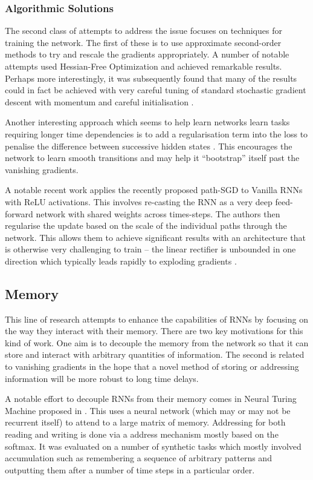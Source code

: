 \subsubsection{Algorithmic Solutions}
The second class of attempts to address the issue focuses on techniques for training the network.
 The first of these is to use approximate
second-order methods to try and rescale the gradients appropriately. A number of notable attempts
used Hessian-Free Optimization \autocite{Martens2011, Boulanger-Lewandowski2012} and achieved
remarkable results. Perhaps more interestingly, it was subsequently found that many of the results
could in fact be achieved with very careful tuning of standard stochastic gradient descent with
momentum and careful initialisation \autocite{Sutskever2013a}.

Another interesting approach which seems to help learn networks learn tasks requiring longer time
dependencies is to add a regularisation term into the loss to penalise the difference between
successive hidden states \autocite{Krueger2016}. This encourages the network to learn smooth
transitions and may help it ``bootstrap'' itself past the vanishing gradients.

A notable recent work applies the recently proposed path-SGD \autocite{Neyshabur2015} to Vanilla
RNNs with ReLU activations. This involves re-casting the RNN as a very deep feed-forward network with
shared weights across times-steps. The authors then regularise the update based on the scale of
the individual paths through the network. This allows them to achieve significant results with an
architecture that is otherwise very challenging to train -- the linear rectifier is unbounded in
one direction which typically leads rapidly to exploding gradients \autocite{Neyshabur2016}.


\subsection{Memory}
This line of research attempts to enhance the capabilities of RNNs by focusing on the way they
interact with their memory. There are two key motivations for this kind of work. 
One aim is to decouple the memory from the network so that it can store and interact with arbitrary
quantities of information. The second is related to vanishing gradients in the hope that a novel
method of storing or addressing information will be more robust to long time delays.

A notable effort to decouple RNNs from their memory comes in Neural Turing Machine proposed in
\autocite{Graves2014}. This uses a neural network (which may or may not be recurrent itself) to
attend to a large matrix of memory. Addressing for both reading and writing is done via a
address mechanism mostly based on the softmax. It was evaluated on a number of synthetic tasks
which mostly involved accumulation such as remembering a sequence of arbitrary patterns and outputting
them after a number of time steps in a particular order.

